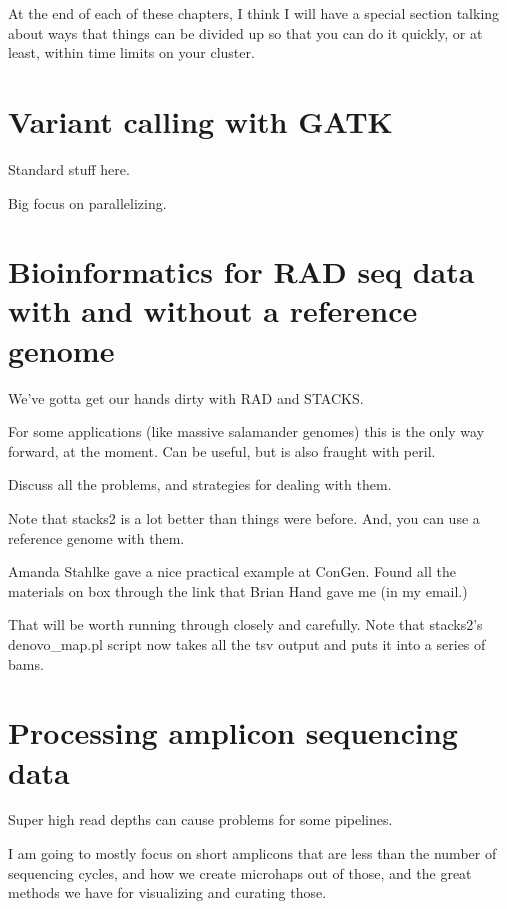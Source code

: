 \documentclass[]{krantz}
\begin{document}
At the end of each of these chapters, I think I will
have a special section talking about ways that things can be divided
up so that you can do it quickly, or at least, within time limits
on your cluster.

\hypertarget{variant-calling-with-gatk}{%
\chapter{Variant calling with GATK}\label{variant-calling-with-gatk}}

Standard stuff here.

Big focus on parallelizing.

\hypertarget{bioinformatics-for-rad-seq-data-with-and-without-a-reference-genome}{%
\chapter{Bioinformatics for RAD seq data with and without a reference genome}\label{bioinformatics-for-rad-seq-data-with-and-without-a-reference-genome}}

We've gotta get our hands dirty with RAD and STACKS.

For some applications (like massive salamander genomes) this is the only
way forward, at the moment. Can be useful, but is also
fraught with peril.

Discuss all the problems, and strategies for dealing with them.

Note that stacks2 is a lot better than things were before. And, you can use
a reference genome with them.

Amanda Stahlke gave a nice practical example at ConGen. Found all the materials
on box through the link that Brian Hand gave me (in my email.)

That will be worth running through closely and carefully. Note that stacks2's denovo\_map.pl script
now takes all the tsv output and puts it into a series of bams.

\hypertarget{processing-amplicon-sequencing-data}{%
\chapter{Processing amplicon sequencing data}\label{processing-amplicon-sequencing-data}}

Super high read depths can cause problems for some pipelines.

I am going to mostly focus on short amplicons that are less than the
number of sequencing cycles, and how we create microhaps out of those, and
the great methods we have for visualizing and curating those.
\end{document}
